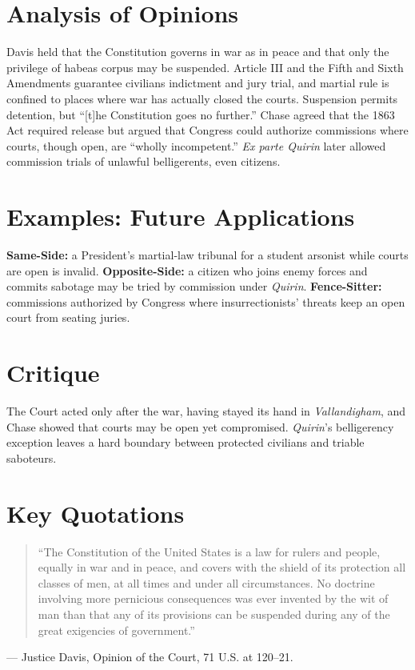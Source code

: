 \documentclass[12pt]{article}
\begin{document}
\section{Analysis of Opinions}
Davis held that the Constitution governs in war as in peace and that only the privilege of habeas corpus may be suspended. Article III and the Fifth and Sixth Amendments guarantee civilians indictment and jury trial, and martial rule is confined to places where war has actually closed the courts. Suspension permits detention, but ``[t]he Constitution goes no further.'' Chase agreed that the 1863 Act required release but argued that Congress could authorize commissions where courts, though open, are ``wholly incompetent.'' \textit{Ex parte Quirin} later allowed commission trials of unlawful belligerents, even citizens.

\section{Examples: Future Applications}
\textbf{Same-Side:} a President's martial-law tribunal for a student arsonist while courts are open is invalid. \textbf{Opposite-Side:} a citizen who joins enemy forces and commits sabotage may be tried by commission under \textit{Quirin}. \textbf{Fence-Sitter:} commissions authorized by Congress where insurrectionists' threats keep an open court from seating juries.

\section{Critique}
The Court acted only after the war, having stayed its hand in \textit{Vallandigham}, and Chase showed that courts may be open yet compromised. \textit{Quirin}'s belligerency exception leaves a hard boundary between protected civilians and triable saboteurs.

\section{Key Quotations}
\begin{quote}
``The Constitution of the United States is a law for rulers and people, equally in war and in peace, and covers with the shield of its protection all classes of men, at all times and under all circumstances. No doctrine involving more pernicious consequences was ever invented by the wit of man than that any of its provisions can be suspended during any of the great exigencies of government.''
\end{quote}
\noindent --- Justice Davis, Opinion of the Court, 71 U.S. at 120--21.
\end{document}
